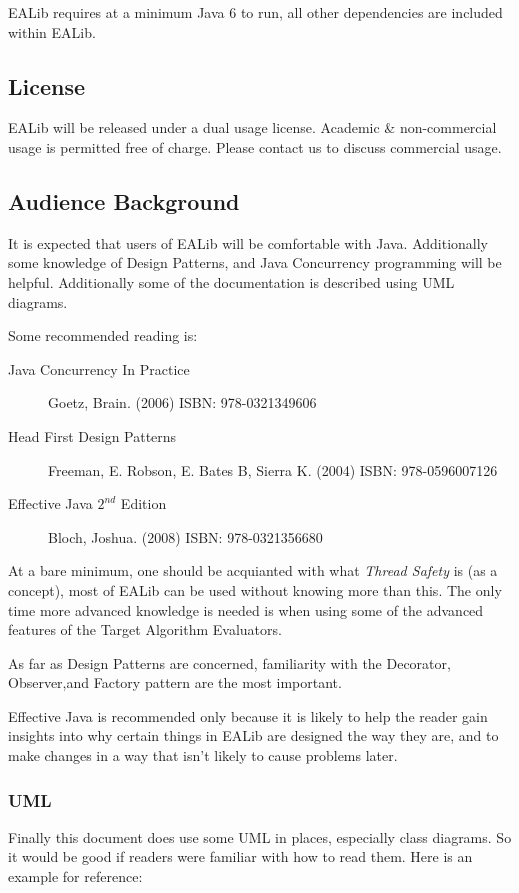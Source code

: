 \documentclass[11pt,letterpaper,oneside]{article}
\begin{document}
EALib requires at a minimum Java 6 to run, all other dependencies are included within EALib.

\subsection{License}

EALib will be released under a dual usage license. Academic \& non-commercial usage is permitted free of charge. Please contact us to discuss commercial usage.


\subsection{Audience Background}

It is expected that users of EALib will be comfortable with Java. Additionally   some knowledge of Design Patterns, and Java Concurrency programming will be helpful. Additionally some of the documentation is described using UML diagrams. 

Some recommended reading is:

\begin{description}

\item[Java Concurrency In Practice] Goetz, Brain. (2006) ISBN: 978-0321349606

\item[Head First Design Patterns] Freeman, E. Robson, E. Bates B, Sierra K. (2004) ISBN: 978-0596007126

\item[Effective Java $2^{nd}$ Edition] Bloch, Joshua. (2008) ISBN: 978-0321356680 
\end{description}


At a bare minimum, one should be acquianted with what \emph{Thread Safety} is (as a concept), most of EALib can be used without knowing more than this. The only time more advanced knowledge is needed is when using some of the advanced features of the Target Algorithm Evaluators.

As far as Design Patterns are concerned, familiarity with the Decorator, Observer,and Factory pattern are the most important.

Effective Java is recommended only because it is likely to help the reader gain insights into why certain things in EALib are designed the way they are, and to make changes in a way that isn't likely to cause problems later.

\subsubsection{UML}
Finally this document does use some UML in places, especially class diagrams. So it would be good if readers were familiar with how to read them. Here is an example for reference:
\end{document}
